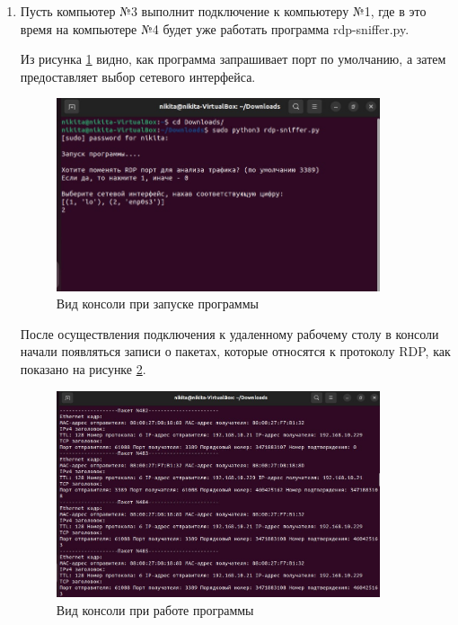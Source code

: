 \documentclass[bachelor, och, coursework]{SCWorks}
\begin{document}
  \begin{enumerate}
    \item Пусть компьютер №3 выполнит подключение к компьютеру №1, где в это время на компьютере №4 будет уже работать программа rdp-sniffer.py.
    
    Из рисунка \ref{cmd-sniff1} видно, как программа запрашивает порт по умолчанию, а затем предоставляет выбор сетевого интерфейса. 

    \begin{figure}[H]
      \centering
      \includegraphics[width=0.9\textwidth]{photo/cmd-sniff1.png}
      \caption{Вид консоли при запуске программы}
      \label{cmd-sniff1}
    \end{figure}

    После осуществления подключения к удаленному рабочему столу в консоли начали появляться записи о пакетах, которые относятся к протоколу RDP, как показано на рисунке
    \ref{cmd-sniff2}.

    \begin{figure}[H]
      \centering
      \includegraphics[width=0.9\textwidth]{photo/cmd-sniff2.png}
      \caption{Вид консоли при работе программы}
      \label{cmd-sniff2}
    \end{figure}


\end{enumerate}
\end{document}
